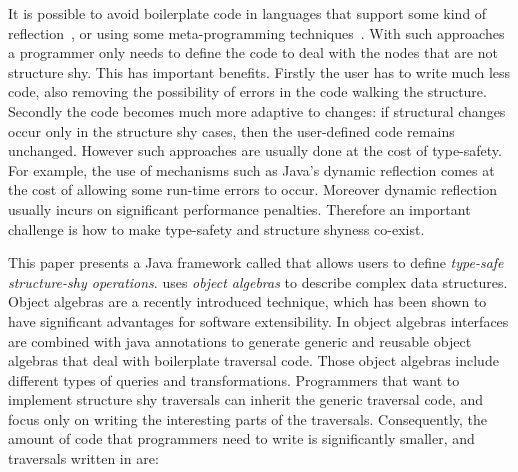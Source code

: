 It is possible to avoid boilerplate code in languages that support
some kind of reflection~\cite{}, or using some meta-programming
techniques~\cite{}.  With such approaches a programmer only needs to
define the code to deal with the nodes that are not structure
shy. This has important benefits. Firstly the user has to write much
less code, also removing the possibility of errors in the code walking
the structure. Secondly the code becomes much more adaptive to
changes: if structural changes occur only in the structure shy cases,
then the user-defined code remains unchanged.  However such
approaches are usually done at the cost of type-safety. For example,
the use of mechanisms such as Java's dynamic reflection comes at the
cost of allowing some run-time errors to occur. Moreover dynamic
reflection usually incurs on significant performance penalties.
Therefore an important challenge is how to make type-safety and structure 
shyness co-exist.

This paper presents a Java framework called \name that allows users to
define \emph{type-safe structure-shy operations}. \name uses
\emph{object algebras} to describe complex data structures. Object
algebras are a recently introduced technique, which has been shown to
have significant advantages for software extensibility.  In \name
object algebras interfaces are combined with java annotations to
generate generic and reusable object algebras that deal with
boilerplate traversal code.  Those object algebras include different
types of queries and transformations.  Programmers
that want to implement structure shy traversals can inherit the
generic traversal code, and focus only on writing the interesting
parts of the traversals. Consequently, the amount of code that
programmers need to write is significantly smaller, and traversals
written in \name are:

